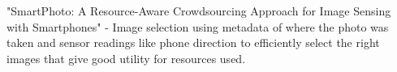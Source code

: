 "SmartPhoto: A Resource-Aware Crowdsourcing Approach for Image Sensing with Smartphones" \cite{wang2014smartphoto} - Image selection using metadata of where the photo was taken and sensor readings like phone direction to efficiently select the right images that give good utility for resources used.

%
%
%
%

